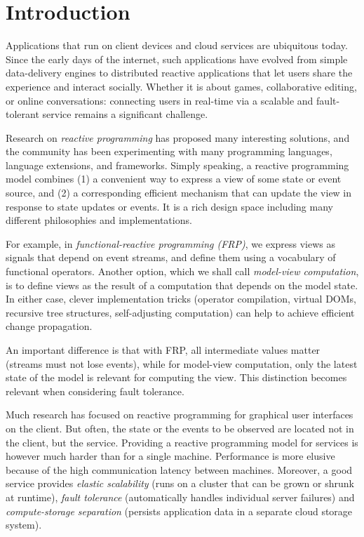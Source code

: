 \section{Introduction}

Applications that run on client devices and cloud services are ubiquitous today. Since the early days of the internet, such applications have evolved from simple data-delivery engines to distributed reactive applications that let users share the experience and interact socially. Whether it is about games, collaborative editing, or online conversations: connecting users in real-time via a scalable and fault-tolerant service remains a significant challenge.

Research on \emph{reactive programming} has proposed many interesting solutions, and the community has been experimenting with many programming languages, language extensions, and frameworks. Simply speaking, a reactive programming model combines (1) a convenient way to express a view of some state or event source, and (2) a corresponding efficient mechanism that can update the view in response to state updates or events. It is a rich design space including many different philosophies and implementations. 

For example, in \emph{functional-reactive programming (FRP)}, we express views as signals that depend on event streams, and define them using a vocabulary of functional operators. Another option, which we shall call \emph{model-view computation}, is to define views as the result of a computation that depends on the model state. In either case, clever implementation tricks (operator compilation, virtual DOMs, recursive tree structures, self-adjusting computation) can help to achieve efficient change propagation. 

An important difference is that with FRP, all intermediate values matter (streams must not lose events), while for model-view computation, only the latest state of the model is relevant for computing the view. This distinction becomes relevant when considering fault tolerance.

Much research has focused on reactive programming for graphical user interfaces \cite{} on the client. But often, the state or the events to be observed are located not in the client, but the service. Providing a reactive programming model for services is however much harder than for a single machine. Performance is more elusive because of the high communication latency between machines. Moreover, a good service provides \emph{elastic scalability} (runs on a cluster that can be grown or shrunk at runtime),  \emph{fault tolerance} (automatically handles individual server failures) and \emph{compute-storage separation} (persists application data in a separate cloud storage system).

